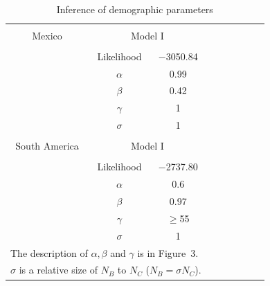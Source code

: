 \renewcommand{\arraystretch}{1.1}
\begin{table}[tb]

\begin{center}
 \caption[]{Inference of demographic parameters\hspace*{0.3cm}}
  \textbf{}\\[-2mm]
{\fontsize{8}{11}\sf
    \begin{tabular}{ccccccccl} \hline
       & & \\[-3mm]
     Mexico  & \multicolumn{2}{c}{Model I}  \\[0.1cm]
    \hline
    & & \\[-3mm]
   & Likelihood & $-$3050.84  \\
  &$\alpha$ & 0.99 \\
  &$\beta$ & 0.42 \\ 
  &$\gamma$   & 1        \\ 
  & $\sigma$ & 1\\
      \hline
    & & \\[-3mm]
    South America  & \multicolumn{2}{c}{Model I}  \\[0.1cm]
        \hline
    & & \\[-3mm]
     & Likelihood &  $-$2737.80  \\
       &$\alpha$ & 0.6 \\
      &$\beta$ & 0.97           \\ 
      &$\gamma$   & $\geq$55   \\
        & $\sigma$ & 1\\ [1mm]
    \hline
\multicolumn{3}{l}{The description of $\alpha, \beta$ and $\gamma$ is in Figure~3.}\\
\multicolumn{3}{l}{$\sigma$ is a relative size of $N_B$ to $N_C$ ($N_B=\sigma N_C$).}\\
    \end{tabular}
    \label{param}  %
}
\end{center}
\end{table}
\renewcommand{\arraystretch}{1}


